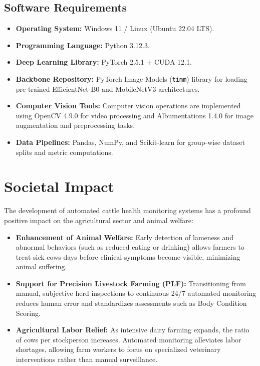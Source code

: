 \subsection{Software Requirements}
\begin{itemize}
    \item \textbf{Operating System:} Windows 11 / Linux (Ubuntu 22.04 LTS).
    \item \textbf{Programming Language:} Python 3.12.3.
    \item \textbf{Deep Learning Library:} PyTorch 2.5.1 + CUDA 12.1.
    \item \textbf{Backbone Repository:} PyTorch Image Models (\texttt{timm}) library for loading pre-trained EfficientNet-B0 and MobileNetV3 architectures.
    \item \textbf{Computer Vision Tools:} Computer vision operations are implemented using OpenCV 4.9.0 for video processing and Albumentations 1.4.0 for image augmentation and preprocessing tasks.
    \item \textbf{Data Pipelines:} Pandas, NumPy, and Scikit-learn for group-wise dataset splits and metric computations.
\end{itemize}

\section{Societal Impact}
The development of automated cattle health monitoring systems has a profound positive impact on the agricultural sector and animal welfare:
\begin{itemize}
    \item \textbf{Enhancement of Animal Welfare:} Early detection of lameness and abnormal behaviors (such as reduced eating or drinking) allows farmers to treat sick cows days before clinical symptoms become visible, minimizing animal suffering.
    \item \textbf{Support for Precision Livestock Farming (PLF):} Transitioning from manual, subjective herd inspections to continuous 24/7 automated monitoring reduces human error and standardizes assessments such as Body Condition Scoring.
    \item \textbf{Agricultural Labor Relief:} As intensive dairy farming expands, the ratio of cows per stockperson increases. Automated monitoring alleviates labor shortages, allowing farm workers to focus on specialized veterinary interventions rather than manual surveillance.
\end{itemize}

